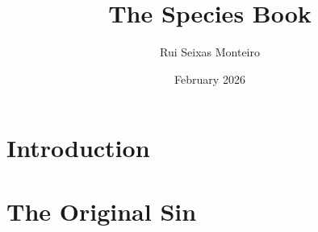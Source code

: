 \documentclass[11pt]{book}
\title{The Species Book}
\author{Rui Seixas Monteiro}
\date{February 2026}
\begin{document}
\frontmatter
\maketitle

\thispagestyle{empty}  %
\tableofcontents


\mainmatter
\part{Introduction}




\part{The Original Sin}




\backmatter
\end{document}
